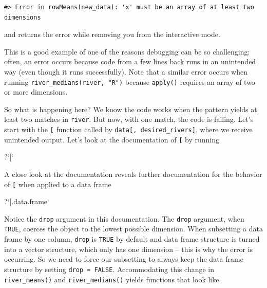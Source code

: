 \documentclass[
]{book}
\newenvironment{Shaded}{\begin{snugshade}}{\end{snugshade}}
\newcommand{\DataTypeTok}[1]{\textcolor[rgb]{0.13,0.29,0.53}{#1}}
\newcommand{\NormalTok}[1]{#1}
\newcommand{\StringTok}[1]{\textcolor[rgb]{0.31,0.60,0.02}{#1}}
\begin{document}
\begin{verbatim}
#> Error in rowMeans(new_data): 'x' must be an array of at least two dimensions
\end{verbatim}

and returns the error while removing you from the interactive mode.

This is a good example of one of the reasons debugging can be so challenging: often, an error occurs because code from a few lines back runs in an unintended way (even though it runs successfully). Note that a similar error occurs when running \texttt{river\_medians(river,\ "R")} because \texttt{apply()} requires an array of two or more dimensions.

So what is happening here? We know the code works when the pattern yields at least two matches in \texttt{river}. But now, with one match, the code is failing. Let's start with the \texttt{{[}} function called by \texttt{data{[},\ desired\_rivers{]}}, where we receive unintended output. Let's look at the documentation of \texttt{{[}} by running

\begin{Shaded}
\begin{Highlighting}[]
\NormalTok{?}\StringTok{`}\DataTypeTok{[}\StringTok{`}
\end{Highlighting}
\end{Shaded}

A close look at the documentation reveals further documentation for the behavior of \texttt{{[}} when applied to a data frame

\begin{Shaded}
\begin{Highlighting}[]
\NormalTok{?}\StringTok{`}\DataTypeTok{[.data.frame}\StringTok{`}
\end{Highlighting}
\end{Shaded}

Notice the \texttt{drop} argument in this documentation. The \texttt{drop} argument, when \texttt{TRUE}, coerces the object to the lowest possible dimension. When subsetting a data frame by one column, \texttt{drop} is \texttt{TRUE} by default and data frame structure is turned into a vector structure, which only has one dimension -- this is why the error is occurring. So we need to force our subsetting to always keep the data frame structure by setting \texttt{drop\ =\ FALSE}. Accommodating this change in \texttt{river\_means()} and \texttt{river\_medians()} yields functions that look like
\end{document}
